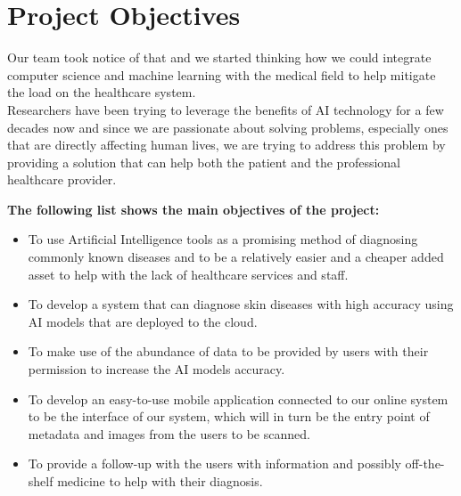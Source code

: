 \section{Project Objectives}
Our team took notice of that and we started thinking how we could integrate computer science and machine learning with the medical field to help mitigate the load on the healthcare system. \\
Researchers have been trying to leverage the benefits of AI technology for a few decades now and since we are passionate about solving problems, especially ones that are directly affecting human lives, we are trying to address this problem by providing a solution that can help both the patient and the professional healthcare provider.
\begin{center}
    \large\textbf{The following list shows the main objectives of the project:}
\end{center}
\begin{itemize}
  \item To use Artificial Intelligence tools as a promising method of diagnosing commonly known diseases and to be a relatively easier and a cheaper added asset to help with the lack of healthcare services and staff.\\
  \item To develop a system that can diagnose skin diseases with high accuracy using AI models that are deployed to the cloud.\\
  \item To make use of the abundance of data to be provided by users with their permission to increase the AI models accuracy.\\
  \item To develop an easy-to-use mobile application connected to our online system to be the interface of our system, which will in turn be the entry point of metadata and images from the users to be scanned.\\
  \item To provide a follow-up with the users with information and possibly off-the-shelf medicine to help with their diagnosis.
\end{itemize}
